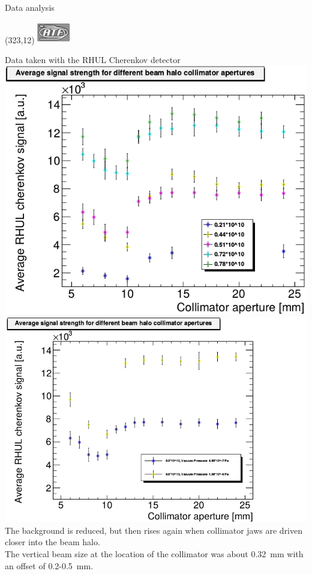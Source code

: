 \documentclass[xcolor={dvipsnames}]{beamer}
\newcommand{\ATFlogo}{
  \setlength{\TPHorizModule}{1pt}
  \setlength{\TPVertModule}{1pt}
  \begin{textblock}{1}(323,12)
   \includegraphics[width=40pt,height=26pt]{figures/ATF_logo.jpg}
  \end{textblock}
}
\begin{document}
\begin{frame}{Data analysis}
\ATFlogo
Data taken with the RHUL Cherenkov detector\\
\vspace*{0.4cm}
 \includegraphics[height=0.55\textheight]{figures/AverageSignal_perAperture.png}
  \includegraphics[height=0.55\textheight]{figures/AverageSignal_perAperture_VacuumPressures.png}\\
The background is reduced, but then rises again when collimator jaws are driven closer into the beam halo.\\
\small The vertical beam size at the location of the collimator was about \SI{0.32}{mm} with an offset of 0.2-\SI{0.5}{mm}.
\end{frame}
\end{document}
